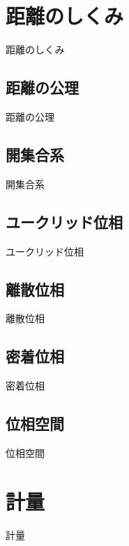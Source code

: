 \section{距離のしくみ}

距離のしくみ

\newpage


\subsection{距離の公理}

距離の公理

\newpage


\subsection{開集合系}

開集合系

\newpage


\subsection{ユークリッド位相}

ユークリッド位相

\newpage


\subsection{離散位相}

離散位相

\newpage


\subsection{密着位相}

密着位相

\newpage


\subsection{位相空間}

位相空間

\newpage


\section{計量}

計量

\newpage
